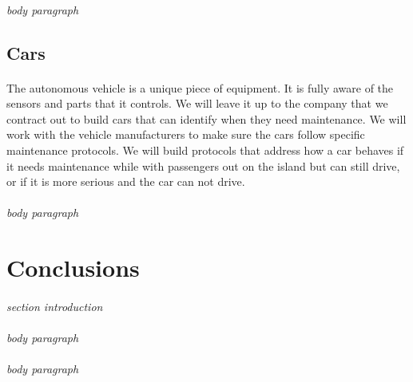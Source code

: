 \documentclass[12pt]{article}
\begin{document}
	\paragraph{} \textit{body paragraph}

	\subsection{Cars}
	\paragraph{} The autonomous vehicle is a unique piece of equipment. It is fully 
	aware of the sensors and parts that it controls. We will leave it up to the 
	company that we contract out to build cars that can identify when they need 
	maintenance. We will work with the vehicle manufacturers to make sure the cars 
	follow specific maintenance protocols. We will build protocols that address how 
	a car behaves if it needs maintenance while with passengers out on the island but 
	can still drive, or if it is more serious and the car can not drive.
	
	\paragraph{} \textit{body paragraph}
	
\section{Conclusions}
\paragraph{} \textit{section introduction} 
\paragraph{} \textit{body paragraph}
\paragraph{} \textit{body paragraph}
\pagebreak

\end{document}
